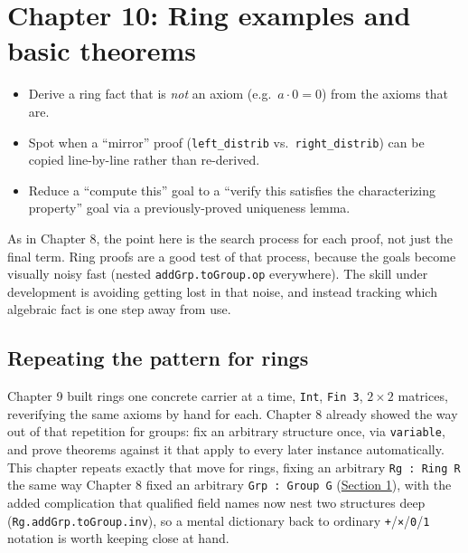 \chapter{Chapter 10: Ring examples and basic theorems}\label{sec:10-ring-theorems:00-index:1}

\begin{learningobjectives}
\begin{itemize}
\tightlist
\item
  Derive a ring fact that is \emph{not} an axiom (e.g.~\(a\cdot 0=0\)) from the axioms that are.
\item
  Spot when a ``mirror'' proof (\texttt{left\_\allowbreak{}distrib} vs.~\texttt{right\_\allowbreak{}distrib}) can be copied line-by-line rather than re-derived.
\item
  Reduce a ``compute this'' goal to a ``verify this satisfies the characterizing property'' goal via a previously-proved uniqueness lemma.
\end{itemize}
\end{learningobjectives}


As in Chapter 8, the point here is the search process for each proof, not just the final term. Ring proofs are a good test of that process, because the goals become visually noisy fast (nested \texttt{addGrp.toGroup.op} everywhere). The skill under development is avoiding getting lost in that noise, and instead tracking which algebraic fact is one step away from use.

\section*{Repeating the pattern for rings}\label{sec:10-ring-theorems:00-index:2}

Chapter 9 built rings one concrete carrier at a time, \texttt{Int}, \texttt{Fin 3}, \(2\times 2\) matrices, reverifying the same axioms by hand for each. Chapter 8 already showed the way out of that repetition for groups: fix an arbitrary structure once, via \texttt{variable}, and prove theorems against it that apply to every later instance automatically. This chapter repeats exactly that move for rings, fixing an arbitrary \texttt{Rg : Ring R} the same way Chapter 8 fixed an arbitrary \texttt{Grp : Group G} (\hyperref[sec:10-ring-theorems:01-setup:1]{Section 1}), with the added complication that qualified field names now nest two structures deep (\texttt{Rg.addGrp.toGroup.inv}), so a mental dictionary back to ordinary \texttt{+}/\texttt{×}/\texttt{0}/\texttt{1} notation is worth keeping close at hand.

